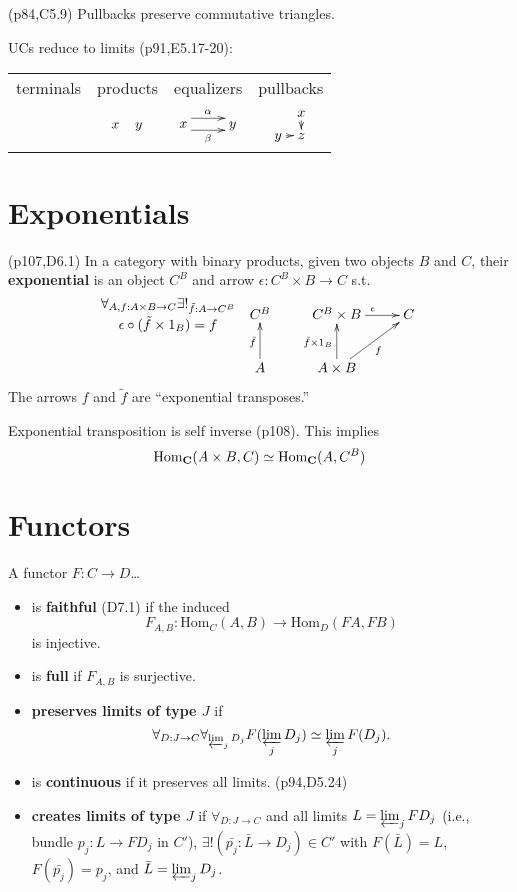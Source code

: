 \documentclass[10pt,twocolumn,letterpaper]{article}
\newcommand{\defn}[1]{{\bf #1}}
\begin{document}
  (p84,C5.9) Pullbacks preserve commutative triangles.

  UCs reduce to limits (p91,E5.17-20):
  \begin{tabular}{cccc}
      terminals & products & equalizers & pullbacks \\
      & $\xymatrix@C5pt{x & y}$
      & $\xymatrix{x \ar@<1ex>[r]^{\alpha} \ar@<-1ex>[r]_{\beta} & y}$
      & $\xymatrix@C5pt@R5pt{& x \ar[d] \\ y \ar[r] & z}$
  \end{tabular}

\section{Exponentials}

  (p107,D6.1) In a category with binary products, given two objects $B$ and $C$,
  their \defn{exponential} is an object $C^B$ and arrow $\epsilon : C^B \times B \to C$
  s.t.
     \[\xymatrix{
     {}\save[]+<-1cm,0cm>*\txt<8pc>{$\forall_{A,f : A \times B \to C}\exists!_{\tilde f : A \to C^B}$\\
                                    $\epsilon \circ (\tilde f \times 1_B) = f$}\restore
     & C^B & C^B \times B \ar[r]^\epsilon & C \\
     & A \ar[u]^{\tilde f} & A \times B \ar[u]^{\tilde f \times 1_B} \ar[ur]_f
     }\]
  The arrows $f$ and $\tilde f$ are ``exponential transposes.''

  Exponential transposition is self inverse (p108).  This implies
    \[ \mbox{Hom}_{\bf C}(A \times B, C) \simeq \mbox{Hom}_{\bf C}(A, C^B) \]

\section{Functors}

  A functor $F : C \to D$\dots
  \begin{itemize}
    \item is \defn{faithful} (D7.1) if the induced
      \[ F_{A,B} : \mbox{Hom}_C(A,B) \to \mbox{Hom}_D(FA,FB) \]
      is injective.

    \item is \defn{full} if $F_{A,B}$ is surjective.

    \item \defn{preserves limits of type $J$} if
      \[ \forall_{D : J \to C}\forall_{\varprojlim_j D_j} F(\varprojlim_j D_j) \simeq \varprojlim_j F(D_j).\]

    \item is \defn{continuous} if it preserves all limits. (p94,D5.24)

    \item \defn{creates limits of type $J$} if $\forall_{D : J \to C}$
      and all limits $L = \varprojlim_j FD_j$ (i.e., bundle $p_j : L \to FD_j$ in $C'$),
      $\exists! (\bar{p_j} : \bar{L} \to D_j) \in C'$ with $F(\bar L) = L$, $F(\bar{p_j}) = p_j$,
      and $\bar L = \varprojlim_j D_j$. 
  \end{itemize}
\end{document}
